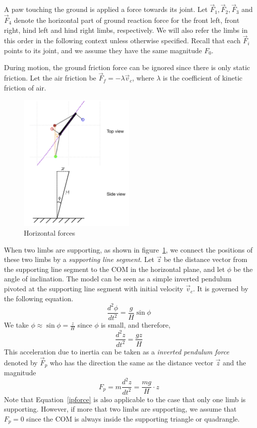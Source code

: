 \documentclass[11pt]{article}
\begin{document}
A paw touching the ground is applied a force towards its joint. Let $ \vec{F}_1, \vec{F}_2, \vec{F}_3 $ and $ \vec{F}_4 $ denote the horizontal part of ground reaction force for the front left, front right, hind left and hind right limbs, respectively. We will also refer the limbs in this order in the following context unless otherwise specified. Recall that each $ \vec{F}_i $ points to its joint, and we assume they have the same magnitude $ F_0 $.

During motion, the ground friction force can be ignored since there is only static friction. Let the air friction be $ \vec{F}_f=-\lambda \vec{v}_c $, where $ \lambda $ is the coefficient of kinetic friction of air.

\begin{figure}[h]
	\centering
	\includegraphics[width=0.5\textwidth]{inverted_pendulum}
	\caption{Horizontal forces}
	\label{fig:invtpdlm}
\end{figure}

When two limbs are supporting, as shown in figure~\ref{fig:invtpdlm}, we connect the positions of these two limbs by a \textit{supporting line segment}. Let $ \vec{z} $ be the distance vector from the supporting line segment to the COM in the horizontal plane, and let $ \phi $ be the angle of inclination. The model can be seen as a simple inverted pendulum pivoted at the supporting line segment with initial velocity $ \vec{v}_c $.  It is governed by the following equation. 
\begin{equation}
	\frac{d^2\phi}{dt^2} = \frac{g}{H} \sin\phi
\end{equation}
We take $ \phi\approx \sin\phi = \frac{z}{H} $ since $ \phi $ is small, and therefore,
\begin{equation}
	\frac{d^2 z}{dt^2} = \frac{gz}{H}
\end{equation}
This acceleration due to inertia can be taken as a \textit{inverted pendulum force} denoted by $ \vec{F}_p $ who has the direction the same as the distance vector $ \vec{z} $ and the magnitude
\begin{equation}\label{ipforce}
	F_p=m\frac{d^2 z}{dt^2}= \frac{mg}{H}\cdot z
\end{equation}
Note that Equation~\ref{ipforce} is also applicable to the case that only one limb is supporting. However, if more that two limbs are supporting, we assume that $ F_p=0 $ since the COM is always inside the supporting triangle or quadrangle.
\end{document}
